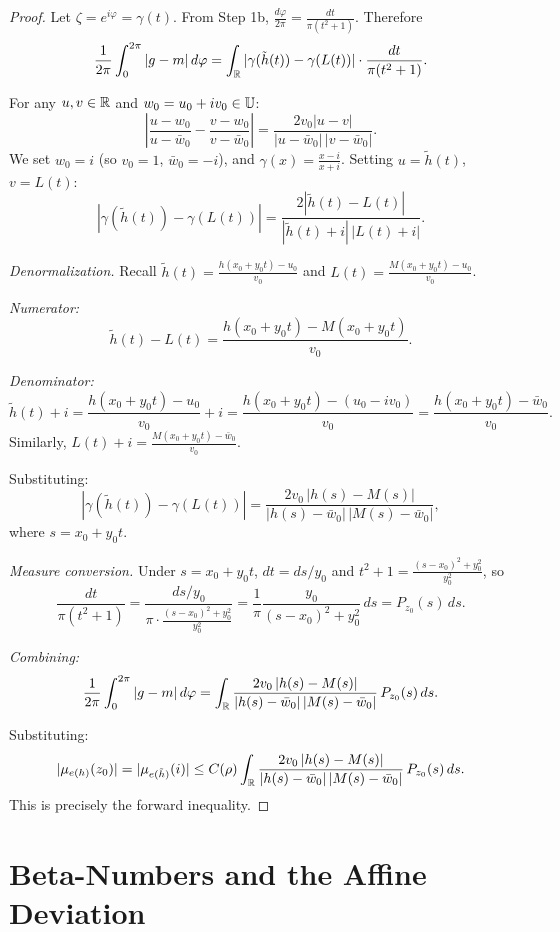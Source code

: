 \begin{proof}
	Let $\zeta = e^{i\varphi} = \gamma(t)$. From Step 1b, $\frac{d\varphi}{2\pi} = \frac{dt}{\pi(t^2+1)}$. Therefore
	\[
	\frac{1}{2\pi}\int_0^{2\pi} |g - m| \,d\varphi = \int_{\mathbb{R}} |\gamma(\tilde{h}(t)) - \gamma(L(t))| \cdot \frac{dt}{\pi(t^2+1)}.
	\]
	
	For any $u, v \in \mathbb{R}$ and $w_0 = u_0 + iv_0 \in \mathbb{U}$:
	\[
	\left|\frac{u - w_0}{u - \bar{w}_0} - \frac{v - w_0}{v - \bar{w}_0}\right| = \frac{2v_0|u - v|}{|u - \bar{w}_0|\,|v - \bar{w}_0|}.
	\]
	We set $w_0 = i$ (so $v_0 = 1$, $\bar{w}_0 = -i$), and $\gamma(x) = \frac{x-i}{x+i}$. Setting $u = \tilde{h}(t)$, $v = L(t)$:
	\[
	|\gamma(\tilde{h}(t)) - \gamma(L(t))| = \frac{2|\tilde{h}(t) - L(t)|}{|\tilde{h}(t) + i|\,|L(t) + i|}.
	\]
	
	\textit{Denormalization.} Recall $\tilde{h}(t) = \frac{h(x_0+y_0t) - u_0}{v_0}$ and $L(t) = \frac{M(x_0+y_0t) - u_0}{v_0}$.
	
	\textit{Numerator:}
	\[
	\tilde{h}(t) - L(t) = \frac{h(x_0+y_0t) - M(x_0+y_0t)}{v_0}.
	\]
	
	\textit{Denominator:}
	\[
	\tilde{h}(t) + i = \frac{h(x_0+y_0t) - u_0}{v_0} + i = \frac{h(x_0+y_0t) - (u_0 - iv_0)}{v_0} = \frac{h(x_0+y_0t) - \bar{w}_0}{v_0}.
	\]
	Similarly, $L(t) + i = \frac{M(x_0+y_0t) - \bar{w}_0}{v_0}$.
	
	Substituting:
	\[
	|\gamma(\tilde{h}(t)) - \gamma(L(t))| = \frac{2v_0\,|h(s) - M(s)|}{|h(s) - \bar{w}_0|\,|M(s) - \bar{w}_0|},
	\]
	where $s = x_0 + y_0 t$.
	
	\textit{Measure conversion.} Under $s = x_0 + y_0 t$, $dt = ds/y_0$ and $t^2 + 1 = \frac{(s-x_0)^2 + y_0^2}{y_0^2}$, so
	\[
	\frac{dt}{\pi(t^2+1)} = \frac{ds/y_0}{\pi \cdot \frac{(s-x_0)^2 + y_0^2}{y_0^2}} = \frac{1}{\pi}\frac{y_0}{(s-x_0)^2 + y_0^2}\,ds = P_{z_0}(s)\,ds.
	\]
	
	\textit{Combining:}
	\[
	\frac{1}{2\pi}\int_0^{2\pi} |g - m| \,d\varphi = \int_{\mathbb{R}} \frac{2v_0\,|h(s) - M(s)|}{|h(s) - \bar{w}_0|\,|M(s) - \bar{w}_0|}\,P_{z_0}(s)\,ds.
	\]
	
	Substituting:
	\[
	|\mu_{e(h)}(z_0)| = |\mu_{e(\tilde{h})}(i)| \leq C(\rho) \int_{\mathbb{R}} \frac{2v_0\,|h(s) - M(s)|}{|h(s) - \bar{w}_0|\,|M(s) - \bar{w}_0|}\,P_{z_0}(s)\,ds.
	\]
	This is precisely the forward inequality. 
	
\end{proof}

\section{Beta-Numbers and the Affine Deviation}\label{sec:beta-theta}

